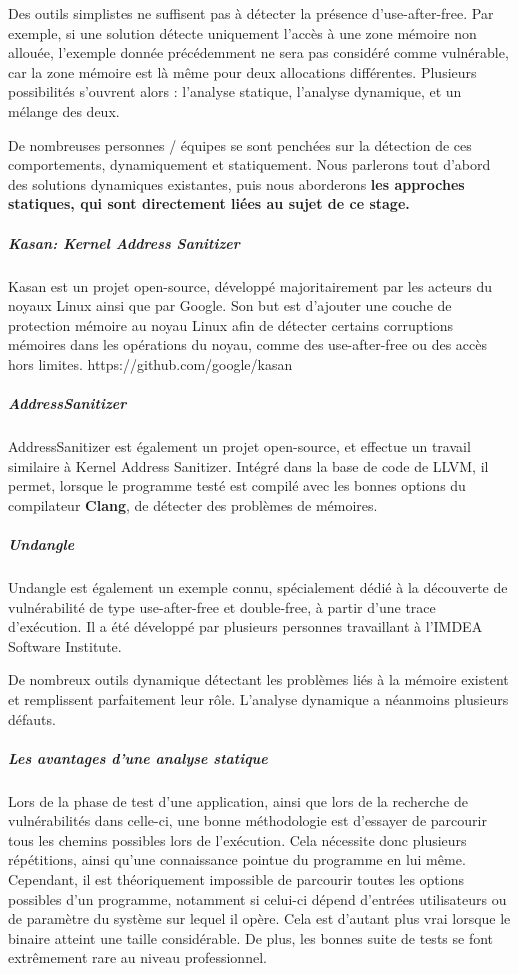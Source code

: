 Des outils simplistes ne suffisent pas à détecter la présence d'use-after-free.\newline
Par exemple, si une solution détecte uniquement l'accès à une zone mémoire non allouée, l'exemple
donnée précédemment ne sera pas considéré comme vulnérable, car la zone mémoire est là même pour deux
allocations différentes. Plusieurs possibilités s'ouvrent alors : l'analyse statique, l'analyse dynamique,
et un mélange des deux.

De nombreuses personnes / équipes se sont penchées sur la détection de ces comportements, dynamiquement et
statiquement. Nous parlerons tout d'abord des solutions dynamiques existantes, puis nous aborderons \textbf{les approches
statiques, qui sont directement liées au sujet de ce stage.}

\subparagraph{Kasan: Kernel Address Sanitizer}
Kasan est un projet open-source, développé majoritairement
par les acteurs du noyaux Linux ainsi que par Google. Son but est d'ajouter une couche de protection
mémoire au noyau Linux afin de détecter certains corruptions mémoires dans les opérations du noyau, comme
des use-after-free ou des accès hors limites.
https://github.com/google/kasan

\subparagraph{AddressSanitizer}
AddressSanitizer est également un projet open-source, et effectue
un travail similaire à Kernel Address Sanitizer. Intégré dans la base de code de
LLVM, il permet, lorsque le programme testé est compilé avec les bonnes options du compilateur \textbf{Clang},
de détecter des problèmes de mémoires.

\subparagraph{Undangle}
Undangle est également un exemple connu, spécialement dédié à la découverte de vulnérabilité
de type use-after-free et double-free, à partir d'une trace d'exécution. Il a été développé par plusieurs
personnes travaillant à l'IMDEA Software Institute.


De nombreux outils dynamique détectant les problèmes liés à la mémoire existent et remplissent parfaitement leur rôle.
L'analyse dynamique a néanmoins plusieurs défauts.\newline

\subparagraph{Les avantages d'une analyse statique}

Lors de la phase de test d'une application, ainsi que lors de la recherche de vulnérabilités dans celle-ci, une bonne méthodologie
est d'essayer de parcourir tous les chemins possibles lors de l'exécution. Cela nécessite donc plusieurs répétitions, ainsi qu'une connaissance
pointue du programme en lui même.\newline
Cependant, il est théoriquement impossible de parcourir toutes les options possibles d'un programme, notamment si
celui-ci dépend d'entrées utilisateurs ou de paramètre du système sur lequel il opère. Cela est d'autant plus vrai lorsque le binaire atteint une taille
considérable. De plus, les bonnes suite de tests se font extrêmement rare au niveau professionnel.

